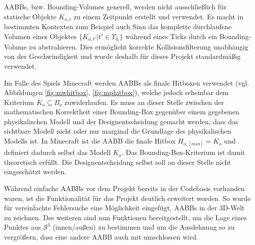 AABBs, bzw. Bounding-Volumes generell, werden nicht ausschließlich für statische Objekte $K_{o,t}$ zu einem Zeitpunkt erstellt und verwendet. Es macht in bestimmten Kontexten zum Beispiel auch Sinn das komplette durchlaufene Volumen eines Objektes $\{K_{o,t'} | t' \in \Upsilon_{\delta_i}\}$ während eines Ticks durch ein Bounding-Volume zu abstrahieren. Dies ermöglicht korrekte Kollisionsfilterung unabhängig von der Geschwindigkeit und wurde deshalb für dieses Projekt standardmäßig verwendet.

Im Falle des Spiels Minecraft werden AABBs als finale Hitboxen verwendet (vgl. Abbildungen \ref{fig:mwhitbox}, \ref{fig:mphitbox}), welche jedoch scheinbar dem Kriterium $K_o \subseteq B_o$ zuwiderlaufen. Es muss an dieser Stelle zwischen der mathematischen Korrektheit einer Bounding-Box gegenüber einem gegebenen physikalischen Modell und der Designentscheidung gemacht werden, dass das sichtbare Modell nicht oder nur marginal die Grundlage des physikalischen Modells ist. In Minecraft ist die AABB die finale Hitbox  $H_{o, [min]} = K_o$ und definiert dadurch selbst das Modell $K_o$. Das Bounding-Box-Kriterium ist damit theoretisch erfüllt. Die Designentscheidung selbst soll an dieser Stelle nicht eingeschätzt werden.

Während einfache AABBs vor dem Projekt bereits in der Codebasis vorhanden waren, ist die Funktionalität für das Projekt deutlich erweitert worden. So wurde für vereinfachte Fehlersuche eine Möglichkeit eingefügt, AABBs in der 3D-Welt zu zeichnen. Des weiteren sind nun Funktionen bereitgestellt, um die Lage eines Punktes aus $\mathcal{S}^3$ (innen/außen) zu bestimmen und um die Ausdehnung so zu vergrößern, dass eine andere AABB auch mit umschlossen wird.